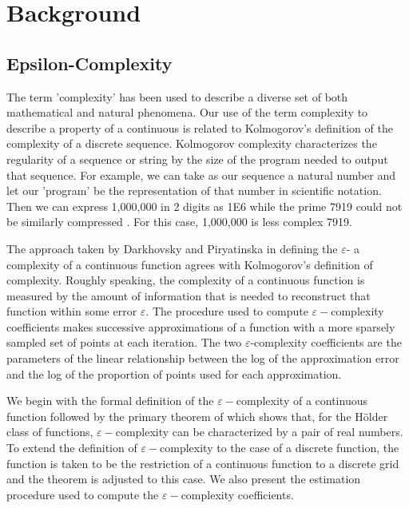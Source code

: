 

\chapter{Background}
    
\section{Epsilon-Complexity} 
  

  The term 'complexity' has been used to describe a diverse set of both mathematical and natural phenomena. Our use of the term complexity to describe a property of a continuous is related to Kolmogorov's definition of the complexity of a discrete sequence. Kolmogorov complexity characterizes the regularity of a
   sequence or string by the size of the program needed to output that sequence. For example, we can take as our sequence a natural number and let our 'program' be the representation of that number in scientific notation.
    Then we can express 1,000,000 in 2 digits as 1E6 while the prime 7919 could not be similarly compressed \cite{vitanyi1993}. For
    this case, 1,000,000 is less complex 7919. 

  The approach taken by Darkhovsky and Piryatinska in defining the $\varepsilon$- a complexity of a continuous function agrees with Kolmogorov's definition of complexity\cite{darkhovsky2013}. 
   Roughly speaking, the complexity of a continuous 
   function is measured by the amount of information that is needed to reconstruct that function within some error $\varepsilon$. 
   The procedure used to compute $\varepsilon-$complexity coefficients makes successive approximations of
   a function with a more sparsely sampled set of points at each iteration. The two $\varepsilon$-complexity coefficients are the
   parameters of the linear relationship between 
   the log of the approximation error and the log of the proportion 
   of points used for each approximation.

  
  We begin with the formal definition of the $\varepsilon-$complexity of a continuous function followed by the primary theorem of \cite{darkhovsky2013} which shows that, for the H\"older class of functions, $\varepsilon-$complexity can be characterized by a pair of real numbers. To extend the definition of $\varepsilon-$complexity to the case of a discrete function, the function is taken to be the restriction of a continuous function to a discrete grid and the theorem is adjusted to this case. We also present the estimation procedure used to compute the $\varepsilon-$complexity coefficients. 

